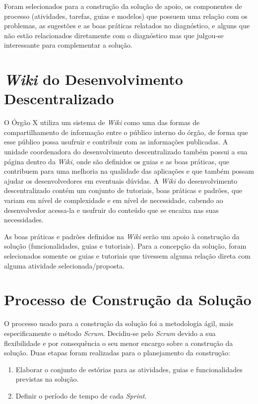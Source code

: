 Foram selecionados para a construção da solução de apoio, os componentes de processo (atividades, tarefas, guias e modelos) que possuem uma relação com os problemas, as sugestões e as boas práticas relatados no diagnóstico, e alguns que não estão relacionados diretamente com o diagnóstico mas que julgou-se interessante para complementar a solução.

\section{\textit{Wiki} do Desenvolvimento Descentralizado}

O Órgão X utiliza um sistema de \textit{Wiki} como uma das formas de compartilhamento de informação entre o público interno do órgão, de forma que esse público possa usufruir e contribuir com as informações publicadas. A unidade coordenadora do desenvolvimento descentralizado também possui a sua página dentro da \textit{Wiki}, onde são definidos os guias e as boas práticas, que contribuem para uma melhoria na qualidade das aplicações e que também possam ajudar os desenvolvedores em eventuais dúvidas. A \textit{Wiki} do desenvolvimento descentralizado contém um conjunto de tutoriais, boas práticas e padrões, que variam em nível de complexidade e em nível de necessidade, cabendo ao desenvolvedor acessa-la e usufruir do conteúdo que se encaixa nas suas necessidades.

As boas práticas e padrões definidos na \textit{Wiki} serão um apoio à construção da solução (funcionalidades, guias e tutoriais). Para a concepção da solução, foram selecionados somente os guias e tutoriais que tivessem alguma relação direta com alguma atividade selecionada/proposta.

\section{Processo de Construção da Solução}

O processo usado para a construção da solução foi a metodologia ágil, mais especificamente o método \textit{Scrum}. Decidiu-se pelo \textit{Scrum} devido a sua flexibilidade e por consequência o seu menor encargo sobre a construção da solução. Duas etapas foram realizadas para o planejamento da construção:

\begin{enumerate}
\item Elaborar o conjunto de estórias para as atividades, guias e funcionalidades previstas na solução.
\item Definir o período de tempo de cada \textit{Sprint}.
\end{enumerate}

